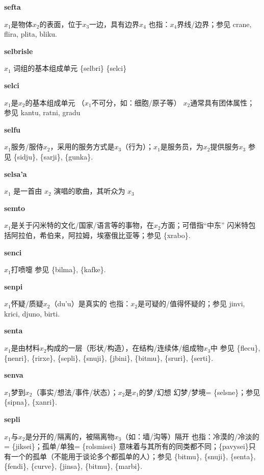 \documentclass[notitlepage,twocolumn,a4paper,10pt]{book}
\begin{document}
{\sffamily\bfseries sefta}\enspace {\ttfamily\bfseries[    sfe]}  $x_1$是物体$x_2$的表面，位于$x_3$一边，具有边界$x_4$ \textemdash{} 也指：$x_4$界线\slash{}边界；参见 {crane}, {flira}, {plita}, {bliku}.

{\sffamily\bfseries selbrisle} $x_1$ 词组的基本组成单元 \textemdash{} \{selbri\} \{selci\}

{\sffamily\bfseries selci}\enspace {\ttfamily\bfseries[    sle]}  $x_1$是$x_2$的基本组成单元 （$x_1$不可分，如：细胞\slash{}原子等） \textemdash{} $x_2$通常具有团体属性；参见 {kantu}, {ratni}, {gradu}

{\sffamily\bfseries selfu}\enspace {\ttfamily\bfseries[sef     se'u]}  $x_1$服务\slash{}服侍$x_2$，采用的服务方式是$x_3$（行为）；$x_1$是服务员，为$x_2$提供服务$x_3$ \textemdash{} 参见 \{sidju\}, \{sarji\}, \{gunka\}.

{\sffamily\bfseries selsa'a} $x_1$ 是一首由 $x_2$ 演唱的歌曲，其听众为 $x_3$

{\sffamily\bfseries semto}\enspace {\ttfamily\bfseries[    sme]}  $x_1$是关于闪米特的文化\slash{}国家\slash{}语言等的事物，在$x_2$方面；可借指“中东” \textemdash{} 闪米特包括阿拉伯，希伯来，阿拉姆，埃塞俄比亚等；参见 \{xrabo\}.

{\sffamily\bfseries senci}\enspace {\ttfamily\bfseries[sec]}  $x_1$打喷嚏 \textemdash{} 参见 \{bilma\}, \{kafke\}.

{\sffamily\bfseries senpi}\enspace {\ttfamily\bfseries[sen]}  $x_1$怀疑\slash{}质疑$x_2$（du'u）是真实的 \textemdash{} 也指：$x_2$是可疑的\slash{}值得怀疑的；参见 {jinvi}, {krici}, {djuno}, {birti}.

{\sffamily\bfseries senta}\enspace {\ttfamily\bfseries[set]}  $x_1$是由材料$x_2$构成的一层（形状\slash{}构造），在结构\slash{}连续体\slash{}组成物$x_3$中 \textemdash{} 参见 \{flecu\}, \{nenri\}, \{rirxe\}, \{sepli\}, \{snuji\}, \{jbini\}, \{bitmu\}, \{sruri\}, \{serti\}.

{\sffamily\bfseries senva}  $x_1$梦到$x_2$（事实\slash{}想法\slash{}事件\slash{}状态）；$x_2$是$x_1$的梦\slash{}幻想 \textemdash{} 幻梦\slash{}梦境= \{selsne\}；参见 \{sipna\}, \{xanri\}.

{\sffamily\bfseries sepli}  $x_1$与$x_2$是分开的\slash{}隔离的，被隔离物$x_3$（如：墙\slash{}沟等）隔开 \textemdash{} 也指：冷漠的\slash{}冷淡的= \{jiksei\}；孤单\slash{}单独= \{rolsmisei\} 意味着与其所有的同类都不同；\{pavysei\}只有一个的孤单（不能用于谈论多个都孤单的人）；参见 \{bitmu\}, \{snuji\}, \{senta\}, \{fendi\}, \{curve\}, \{jinsa\}, \{bitmu\}, \{marbi\}.
\end{document}
